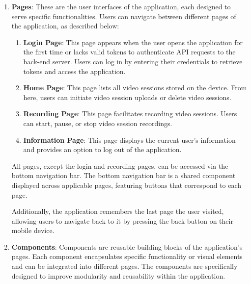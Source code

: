 \begin{enumerate}
    \item \textbf{Pages}: These are the user interfaces of the application, each designed to serve specific functionalities. Users can navigate between different pages of the application, as described below:  
    \begin{enumerate}  
        \item \textbf{Login Page}: This page appears when the user opens the application for the first time or lacks valid tokens to authenticate API requests to the back-end server. Users can log in by entering their credentials to retrieve tokens and access the application.  
        \item \textbf{Home Page}: This page lists all video sessions stored on the device. From here, users can initiate video session uploads or delete video sessions.  
        \item \textbf{Recording Page}: This page facilitates recording video sessions. Users can start, pause, or stop video session recordings.  
        \item \textbf{Information Page}: This page displays the current user's information and provides an option to log out of the application.  
    \end{enumerate}  
    All pages, except the login and recording pages, can be accessed via the bottom navigation bar. The bottom navigation bar is a shared component displayed across applicable pages, featuring buttons that correspond to each page.  
    
    Additionally, the application remembers the last page the user visited, allowing users to navigate back to it by pressing the back button on their mobile device.      

    \item \textbf{Components}: Components are reusable building blocks of the application's pages. Each component encapsulates specific functionality or visual elements and can be integrated into different pages. The components are specifically designed to improve modularity and reusability within the application.
    

\end{enumerate}

